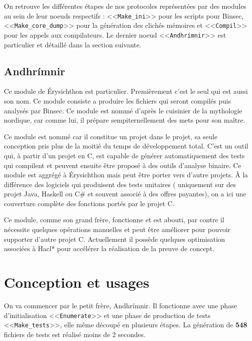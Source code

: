On retrouve les différentes étapes de nos protocoles représentées par des modules au sein de leur noeuds respectifs : <<\texttt{Make\_ini}>> pour les scripts pour Binsec, <<\texttt{Make\_core\_dump}>> pour la génération des clichés mémoires et <<\texttt{Compil}>> pour les appels aux compilateurs. Le dernier noeud <<\texttt{Andhrímnir}>> est particulier et détaillé dans la section suivante. 

\subsection*{Andhrímnir}

Ce module de Érysichthon est particulier. Premièrement c'est le seul qui est aussi son nom. Ce module consiste a produire les fichiers qui seront compilés puis analysés par Binsec. Ce module est nommé d'après le cuisinier de la mythologie nordique, car comme lui, il prépare sempiternellement des mets pour son maître.\smallbreak

Ce module est nommé car il constitue un projet dans le projet, sa seule conception pris plus de la moitié du temps de développement total. C'est un outil qui, à partir d'un projet en C, est capable de générer automatiquement des tests qui compilent et peuvent ensuite être proposé à des outils d'analyse binaire. Ce module est aggrégé à Érysichthon mais peut être porter vers d'autre projets. À la différence des logiciels qui produisent des tests unitaires ( uniquement sur des projet Java, Haskell ou C\# et souvent associé à des offres payantes), on a ici une couverture complète des fonctions portés par le projet C.\smallbreak

Ce module, comme son grand frère, fonctionne et est abouti, par contre il nécessite quelques opérations manuelles et peut être améliorer pour pouvoir supporter d'autre projet C. Actuellement il possède quelques optimisation associées à Hacl* pour accélérer la réalisation de la preuve de concept.

\section{Conception et usages}

On va commencer par le petit frère, Andhrímnir. Il fonctionne avec une phase d'initialisation <<\texttt{Enumerate}>> et une phase de production de tests <<\texttt{Make\_tests}>>, elle même découpé en plusieurs étapes. La génération de \textbf{548} fichiers de tests est réalisé moins de 2 secondes.\smallbreak

